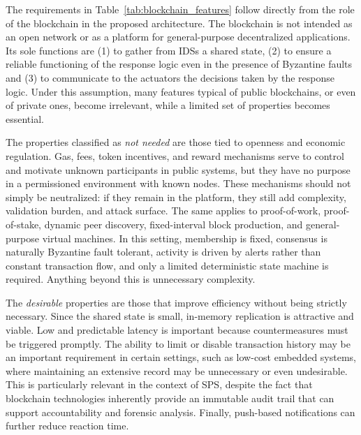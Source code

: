 The requirements in Table~\ref{tab:blockchain_features} follow directly from the role of the blockchain in the proposed architecture. The blockchain is not intended as an open network or as a platform for general-purpose decentralized applications. Its sole functions are (1) to gather from IDSs a shared state, (2) to ensure a reliable functioning of the response logic even in the presence of Byzantine faults and (3) to communicate to the actuators the decisions taken by the response logic. Under this assumption, many features typical of public blockchains, or even of private ones, become irrelevant, while a limited set of properties becomes essential.

The properties classified as \emph{not needed} are those tied to openness and economic regulation. Gas, fees, token incentives, and reward mechanisms serve to control and motivate unknown participants in public systems, but they have no purpose in a permissioned environment with known nodes. These mechanisms should not simply be neutralized: if they remain in the platform, they still add complexity, validation burden, and attack surface. The same applies to proof-of-work, proof-of-stake, dynamic peer discovery, fixed-interval block production, and general-purpose virtual machines. In this setting, membership is fixed, consensus is naturally Byzantine fault tolerant, activity is driven by alerts rather than constant transaction flow, and only a limited deterministic state machine is required. Anything beyond this is unnecessary complexity.

The \emph{desirable} properties are those that improve efficiency without being strictly necessary. Since the shared state is small, in-memory replication is attractive and viable. Low and predictable latency is important because countermeasures must be triggered promptly. The ability to limit or disable transaction history may be an important requirement in certain settings, such as low-cost embedded systems, where maintaining an extensive record may be unnecessary or even undesirable. This is particularly relevant in the context of SPS, despite the fact that blockchain technologies inherently provide an immutable audit trail that can support accountability and forensic analysis. Finally, push-based notifications can further reduce reaction time.  %


